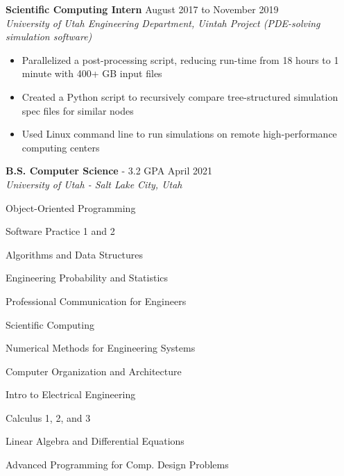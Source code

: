 \documentclass{article}
\begin{document}
\noindent \textbf{Scientific Computing Intern} \hfill  August 2017 to November 2019 \\
\textit{University of Utah Engineering Department, Uintah Project (PDE-solving simulation software)}
\begin{itemize}
    \item Parallelized a post-processing script, reducing run-time from 18 hours to 1 minute with 400+ GB input files
    \item Created a Python script to recursively compare tree-structured simulation spec files for similar nodes
    \item Used Linux command line to run simulations on remote high-performance computing centers
\end{itemize}



\noindent \textbf{B.S. Computer Science} - 3.2 GPA \hfill April 2021 \\
\textit{University of Utah - Salt Lake City, Utah}
\begin{itemize}
\begin{multicols}{2}
    \item Object-Oriented Programming
    \item Software Practice 1 and 2
    \item Algorithms and Data Structures
    \item Engineering Probability and Statistics
    \item Professional Communication for Engineers
    \item Scientific Computing
    \item Numerical Methods for Engineering Systems
    \item Computer Organization and Architecture
    \item Intro to Electrical Engineering
    \item Calculus 1, 2, and 3
    \item Linear Algebra and Differential Equations
    \item Advanced Programming for Comp. Design Problems
\end{multicols}
\end{itemize}
\end{document}
